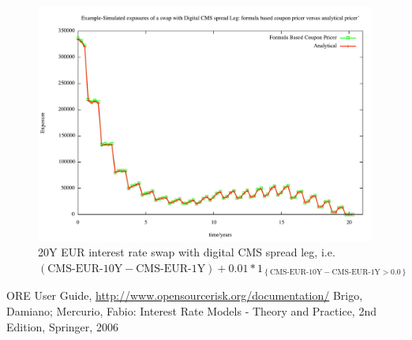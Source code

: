 \documentclass[12pt, a4paper]{article}
\begin{document}
\begin{figure}
  \includegraphics[scale=0.55]{Digital_MC1K_2.pdf}
  \caption{20Y EUR interest rate swap with digital CMS spread leg, i.e.
    $\left(\text{CMS-EUR-10Y}- \text{CMS-EUR-1Y} \right)+ 0.01 * 1_{\left\{\text{CMS-EUR-10Y}-
        \text{CMS-EUR-1Y}>0.0\right\}} $ }
\label{fig:Digital:MC1K}
\end{figure}



\pagebreak
\renewcommand{\thesubsection}{\Alph{subsection}}




\begin{thebibliography}{1}

 ORE User Guide,
  \url{http://www.opensourcerisk.org/documentation/}
Brigo, Damiano; Mercurio, Fabio: Interest Rate Models - Theory and
  Practice, 2nd Edition, Springer, 2006



\end{thebibliography}
\end{document}
